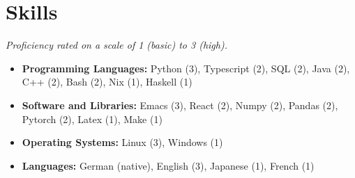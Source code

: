 \documentclass[letterpaper, 9pt]{article}
\begin{document}
	\section*{Skills}
	\noindent\small\textit{Proficiency rated on a scale of 1 (basic) to 3 (high).}
	\normalsize
	\begin{itemize}
		\item \textbf{Programming Languages:} Python (3), Typescript (2), SQL (2), Java (2), C++ (2), Bash (2), Nix (1), Haskell (1)
		\item \textbf{Software and Libraries:} Emacs (3), React (2), Numpy (2), Pandas (2), Pytorch (2), Latex (1), Make (1)
		\item \textbf{Operating Systems:} Linux (3), Windows (1)
		\item \textbf{Languages:} German (native), English (3), Japanese (1), French (1)
	\end{itemize}
\end{document}
